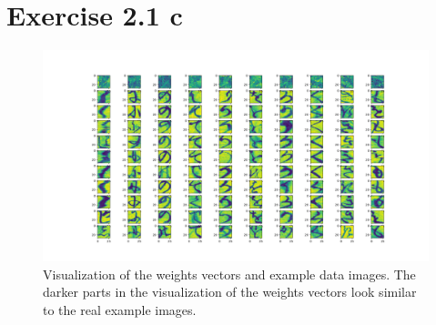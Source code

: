 \documentclass[11pt]{article} %
\begin{document}
\section*{Exercise 2.1 c}
\begin{figure}[htb]
  \centering
  \centerline{\includegraphics[width=1.35\textwidth ]{Figure_1_1.png}}
  \vspace{-5pt}
    \centering
\caption{Visualization of the weights vectors and example data images. The darker parts in the visualization of the weights vectors look similar to the real example images.}
\vspace{-1pt}
\end{figure}
\clearpage
\end{document}
